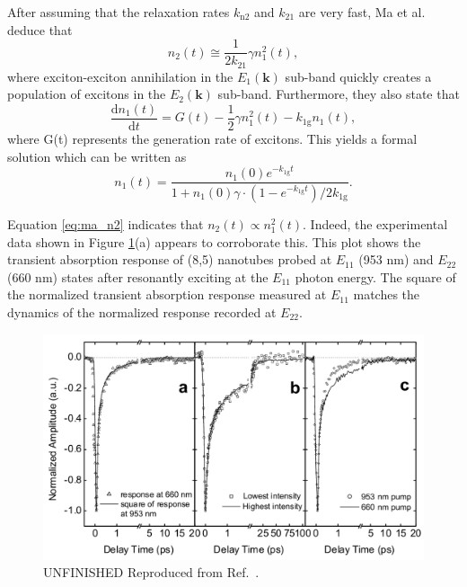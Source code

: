 After assuming that the relaxation rates $k_\text{n2}$ and $k_\text{21}$ are very fast, Ma et al. deduce that
\begin{equation}
	n_2(t) \cong \frac{1}{2 k_{21}} \gamma n^2_1(t),
	\label{eq:ma_n2}
\end{equation}
where exciton-exciton annihilation in the $E_1(\mathbf{k})$ sub-band quickly creates a population of excitons in the $E_2(\mathbf{k})$ sub-band. Furthermore, they also state that
\begin{equation}
\frac{\mathrm{d} n_1(t)}{\mathrm{d}t} = G(t) - \frac{1}{2}\gamma n_1^2(t) - k_\text{1g} n_1(t),
\end{equation}
where G(t) represents the generation rate of excitons.  This yields a formal solution which can be written as
%
\begin{equation}
	n_1(t) = \frac{n_1(0)e^{-k_\text{1g}t}}{1 + n_1(0) \gamma\cdot(1 - e^{-k_\text{1g}t} )/2k_\text{1g}}.
	\label{eq:exciton_anih_ma_2005}
\end{equation}
%

Equation \eqref{eq:ma_n2} indicates that $n_2(t) \propto n_1^2(t)$. Indeed, the experimental data shown in Figure \ref{fig:abs_ma_2005}(a) appears to corroborate this. This plot shows the transient absorption response of (8,5) nanotubes probed at $E_{11}$ (953 nm) and $E_{22}$ (660 nm) states after resonantly exciting at the $E_{11}$ photon energy. The square of the normalized transient absorption response measured at $E_{11}$ matches the dynamics of the normalized response recorded at $E_{22}$.

\begin{figure}[ht]
	\centering
	\includegraphics[scale=0.35]{images/chapter_prior_works/abs_ma_2005}
	\caption{{\color{red} UNFINISHED} Reproduced from Ref.\ \cite{ma2005femtosecond}.}
	\label{fig:abs_ma_2005}
\end{figure}


